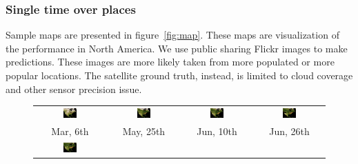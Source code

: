 \subsubsection{Single time over places}

Sample maps are presented in figure~\ref{fig:map}. These maps are visualization of the performance
in North America.
We use public sharing Flickr images to make predictions.  
These images are more likely taken from more populated or more popular locations. The satellite ground truth, instead, is limited to cloud coverage and other sensor precision issue.



\begin{figure}
\begin{center}
\begin{tabular}{cccc}
\includegraphics[width=0.20\textwidth]{map/72.png} &
\includegraphics[width=0.20\textwidth]{map/77.png} &
\includegraphics[width=0.20\textwidth]{map/78.png} &
\includegraphics[width=0.20\textwidth]{map/79.png}  \\
Mar, 6th&May, 25th&Jun, 10th&Jun, 26th\\
\includegraphics[width=0.20\textwidth]{map/82.png} &

\end{tabular}
\end{center}
\end{figure}
